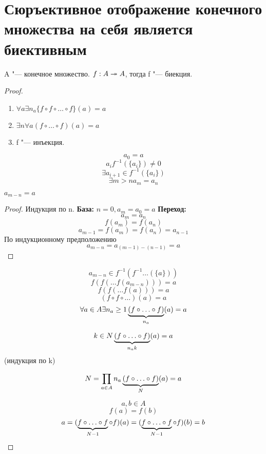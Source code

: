 ﻿\section{Сюръективное отображение конечного множества на себя является биективным}

\begin{theorem}{}
    A "--- конечное множество. 
    $f: A \twoheadrightarrow A$, тогда f "--- биекция.
\end{theorem}

\begin{proof}
    \begin{enumerate}
        \item $\forall a \exists n_a \{f \circ f \circ \ldots \circ f\}(a) = a$
        \item $\exists n \forall a (f \circ \ldots \circ f)(a)  = a$
        \item f "--- инъекция.
    \end{enumerate}
    $$a_0 = a$$
    $$a_i f^{-1}(\{a_i\}) \ne 0$$
    $$\exists a_{i + 1} \in f^{-1}(\{a_i\})$$
    $$\exists m > n a_m = a_n$$
    \begin{lemma}{}
        $a_{m - n} = a$   
    \end{lemma}
    \begin{proof}
        Индукция по n.
        {\bf База:} $n = 0,  a_m = a_0 = a$
        {\bf Переход:} $$a_m = a_n$$
        $$f(a_m) = f(a_n)$$
        $$a_{m - 1} = f(a_m) = f(a_n) = a_{n - 1}$$
        По индукционному предположению 
        $$a_{m - n} = a_{(m - 1) - (n - 1)} = a$$
    \end{proof}
    $$a_{m - n} \in  f^{-1}(f^{-1}\ldots(\{a\}))$$
    $$f(f(\ldots f(a_{m - n}))) = a$$
    $$f(f(\ldots f(a))) = a$$
    $$(f \circ f \circ \ldots)(a) = a$$
    $$\forall a \in A \exists n_a \ge 1 \underbrace{(f \circ \ldots \circ f)}_{n_a}(a) = a$$
   
    $$k \in N \underbrace{(f \circ \ldots \circ f)}_{n_a k}(a) = a$$
    (индукция по k)
    
    $$N = \prod_{a \in A} n_a  \underbrace{(f \circ \ldots \circ f)}_{N}(a) = a$$
    
    $$a, b \in A$$
    $$f(a) = f(b)$$
    $$a = (\underbrace{f \circ \ldots \circ f}_{N - 1} \circ f)(a) = (\underbrace{f \circ \ldots \circ f}_{N - 1} \circ f)(b) = b$$
\end{proof}